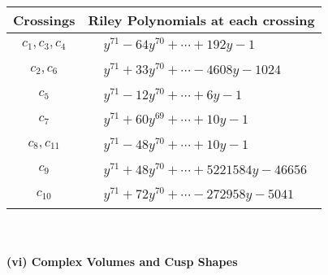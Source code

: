 \documentclass[1p]{elsarticle_modified}
\theoremstyle{definition}
\begin{document}
\begin{tabular}{m{50pt}|m{274pt}}
Crossings & \hspace{64pt}Riley Polynomials at each crossing \\
\hline $$\begin{aligned}c_{1},c_{3},c_{4}\end{aligned}$$&$\begin{aligned}
&y^{71}-64 y^{70}+\cdots+192 y-1
\end{aligned}$\\
\hline $$\begin{aligned}c_{2},c_{6}\end{aligned}$$&$\begin{aligned}
&y^{71}+33 y^{70}+\cdots-4608 y-1024
\end{aligned}$\\
\hline $$\begin{aligned}c_{5}\end{aligned}$$&$\begin{aligned}
&y^{71}-12 y^{70}+\cdots+6 y-1
\end{aligned}$\\
\hline $$\begin{aligned}c_{7}\end{aligned}$$&$\begin{aligned}
&y^{71}+60 y^{69}+\cdots+10 y-1
\end{aligned}$\\
\hline $$\begin{aligned}c_{8},c_{11}\end{aligned}$$&$\begin{aligned}
&y^{71}-48 y^{70}+\cdots+10 y-1
\end{aligned}$\\
\hline $$\begin{aligned}c_{9}\end{aligned}$$&$\begin{aligned}
&y^{71}+48 y^{70}+\cdots+5221584 y-46656
\end{aligned}$\\
\hline $$\begin{aligned}c_{10}\end{aligned}$$&$\begin{aligned}
&y^{71}+72 y^{70}+\cdots-272958 y-5041
\end{aligned}$\\
\hline
\end{tabular}\\~\\
\newpage\flushleft \textbf{(vi) Complex Volumes and Cusp Shapes}
\end{document}

